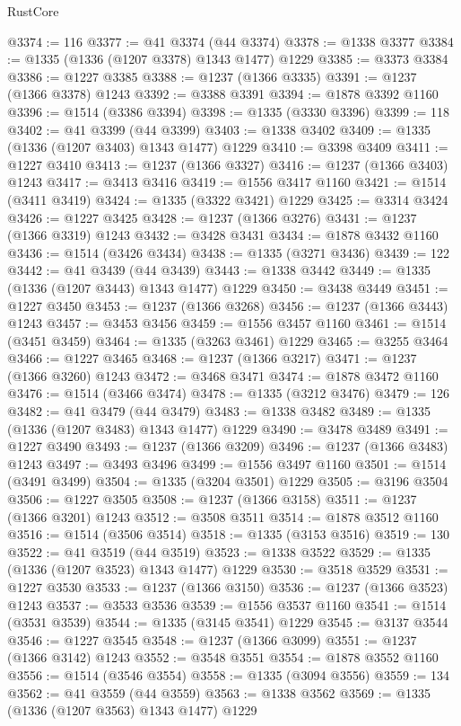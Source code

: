 \begin{lexlean}{RustCore}
\begin{coremodule}
@3374 := 116
@3377 := @41 @3374 (@44 @3374)
@3378 := @1338 @3377
@3384 := @1335 (@1336 (@1207 @3378) @1343 @1477) @1229
@3385 := @3373 @3384
@3386 := @1227 @3385
@3388 := @1237 (@1366 @3335)
@3391 := @1237 (@1366 @3378) @1243
@3392 := @3388 @3391
@3394 := @1878 @3392 @1160
@3396 := @1514 (@3386 @3394)
@3398 := @1335 (@3330 @3396)
@3399 := 118
@3402 := @41 @3399 (@44 @3399)
@3403 := @1338 @3402
@3409 := @1335 (@1336 (@1207 @3403) @1343 @1477) @1229
@3410 := @3398 @3409
@3411 := @1227 @3410
@3413 := @1237 (@1366 @3327)
@3416 := @1237 (@1366 @3403) @1243
@3417 := @3413 @3416
@3419 := @1556 @3417 @1160
@3421 := @1514 (@3411 @3419)
@3424 := @1335 (@3322 @3421) @1229
@3425 := @3314 @3424
@3426 := @1227 @3425
@3428 := @1237 (@1366 @3276)
@3431 := @1237 (@1366 @3319) @1243
@3432 := @3428 @3431
@3434 := @1878 @3432 @1160
@3436 := @1514 (@3426 @3434)
@3438 := @1335 (@3271 @3436)
@3439 := 122
@3442 := @41 @3439 (@44 @3439)
@3443 := @1338 @3442
@3449 := @1335 (@1336 (@1207 @3443) @1343 @1477) @1229
@3450 := @3438 @3449
@3451 := @1227 @3450
@3453 := @1237 (@1366 @3268)
@3456 := @1237 (@1366 @3443) @1243
@3457 := @3453 @3456
@3459 := @1556 @3457 @1160
@3461 := @1514 (@3451 @3459)
@3464 := @1335 (@3263 @3461) @1229
@3465 := @3255 @3464
@3466 := @1227 @3465
@3468 := @1237 (@1366 @3217)
@3471 := @1237 (@1366 @3260) @1243
@3472 := @3468 @3471
@3474 := @1878 @3472 @1160
@3476 := @1514 (@3466 @3474)
@3478 := @1335 (@3212 @3476)
@3479 := 126
@3482 := @41 @3479 (@44 @3479)
@3483 := @1338 @3482
@3489 := @1335 (@1336 (@1207 @3483) @1343 @1477) @1229
@3490 := @3478 @3489
@3491 := @1227 @3490
@3493 := @1237 (@1366 @3209)
@3496 := @1237 (@1366 @3483) @1243
@3497 := @3493 @3496
@3499 := @1556 @3497 @1160
@3501 := @1514 (@3491 @3499)
@3504 := @1335 (@3204 @3501) @1229
@3505 := @3196 @3504
@3506 := @1227 @3505
@3508 := @1237 (@1366 @3158)
@3511 := @1237 (@1366 @3201) @1243
@3512 := @3508 @3511
@3514 := @1878 @3512 @1160
@3516 := @1514 (@3506 @3514)
@3518 := @1335 (@3153 @3516)
@3519 := 130
@3522 := @41 @3519 (@44 @3519)
@3523 := @1338 @3522
@3529 := @1335 (@1336 (@1207 @3523) @1343 @1477) @1229
@3530 := @3518 @3529
@3531 := @1227 @3530
@3533 := @1237 (@1366 @3150)
@3536 := @1237 (@1366 @3523) @1243
@3537 := @3533 @3536
@3539 := @1556 @3537 @1160
@3541 := @1514 (@3531 @3539)
@3544 := @1335 (@3145 @3541) @1229
@3545 := @3137 @3544
@3546 := @1227 @3545
@3548 := @1237 (@1366 @3099)
@3551 := @1237 (@1366 @3142) @1243
@3552 := @3548 @3551
@3554 := @1878 @3552 @1160
@3556 := @1514 (@3546 @3554)
@3558 := @1335 (@3094 @3556)
@3559 := 134
@3562 := @41 @3559 (@44 @3559)
@3563 := @1338 @3562
@3569 := @1335 (@1336 (@1207 @3563) @1343 @1477) @1229

\end{coremodule}
\end{lexlean}
